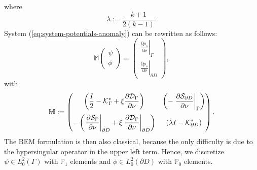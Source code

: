 where
\[
\lambda:=\frac{k+1}{2(k-1)}.
\]
System (\ref{eq:system-potentials-anomaly}) can be rewritten as
follows:
\[
\mathbb{M}\left(\begin{alignedat}{1}\psi\\
\phi
\end{alignedat}
\right)=\left(\begin{alignedat}{1}\left.\frac{\partial p_s}{\partial\nu}\right|_{\Gamma}\\
\left.\frac{\partial p_s}{\partial\nu}\right|_{\partial D}
\end{alignedat}
\right),
\]
with
\[
\mathbb{M}:=\left(\begin{matrix} \left( \ds
\frac{I}{2}-\mathcal{K}_{\Gamma}^{*}
+\xi\frac{\partial\mathcal{D}_{\Gamma}}{\partial\nu}\right) &\ds
\left(-\left.\frac{\partial\mathcal{S}_{\partial D}}{\partial\nu}\right|_{\Gamma}\right)\\
\nm \ds
-\left(\left.\frac{\partial\mathcal{S}_{\Gamma}}{\partial\nu}\right|_{\partial
D}+\xi\left.\frac{\partial
\mathcal{D}_{\Gamma}}{\partial\nu}\right|_{\partial D}\right) &
\ds \left(\lambda I-\mathcal{K}_{\partial D}^{*}\right)
\end{matrix}
\right).
\]
The BEM formulation is then also classical, because the only
difficulty is due to the hypersingular operator in the upper left
term. Hence, we discretize $\psi\in L_0^{2}(\Gamma)$ with
$\mathbb{P}_{1}$ elements and $\phi\in L_{0}^{2}(\partial D)$ with
$\mathbb{P}_{0}$ elements.

